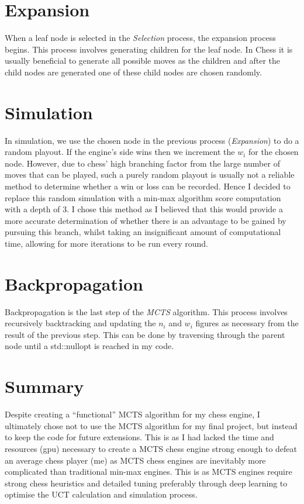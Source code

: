 \section{Expansion}
When a leaf node is selected in the \textit{Selection} process, the expansion process begins. This process involves generating children for the leaf node. In Chess it is usually beneficial to generate all possible moves as the children and after the child nodes are generated one of these child nodes are chosen randomly.
\section{Simulation}
In simulation, we use the chosen node in the previous process (\textit{Expansion}) to do a random playout. If the engine's side wins then we increment the $w_i$ for the chosen node. However, due to chess' high branching factor from the large number of moves that can be played, such a purely random playout is usually not a reliable method to determine whether a win or loss can be recorded. Hence I decided to replace this random simulation with a min-max algorithm score computation with a depth of 3. I chose this method as I believed that this would provide a more accurate determination of whether there is an advantage to be gained by pursuing this branch, whilst taking an insignificant amount of computational time, allowing for more iterations to be run every round.
\section{Backpropagation}
Backpropagation is the last step of the \textit{MCTS} algorithm. This process involves recursively backtracking and updating the $n_i$ and $w_i$ figures as necessary from the result of the previous step. This can be done by traversing through the parent node until a std::nullopt is reached in my code.
\section{Summary}
Despite creating a ``functional'' MCTS algorithm for my chess engine, I ultimately chose not to use the MCTS algorithm for my final project, but instead to keep the code for future extensions. This is as I had lacked the time and resources (gpu) necessary to create a MCTS chess engine strong enough to defeat an average chess player (me) as MCTS chess engines are inevitably more complicated than traditional min-max engines. This is as MCTS engines require strong chess heuristics and detailed tuning preferably through deep learning to optimise the UCT calculation and simulation process.